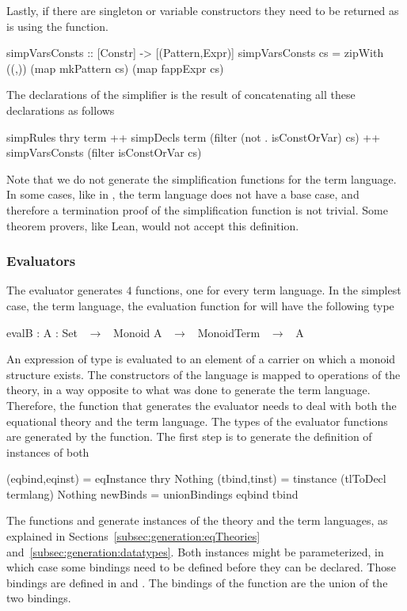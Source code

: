 Lastly, if there are singleton or variable constructors they need to be returned as is using the  function. 
\begin{hscode} 
simpVarsConsts :: [Constr] -> [(Pattern,Expr)]
simpVarsConsts cs =
  zipWith ((,)) (map mkPattern cs) (map fappExpr cs)
\end{hscode}  

The declarations of the simplifier is the result of concatenating all these declarations as follows 
\begin{hscode} 
 simpRules thry term
 ++ simpDecls term (filter (not . isConstOrVar) cs)
 ++ simpVarsConsts (filter isConstOrVar cs) 
\end{hscode} 

Note that we do not generate the simplification functions for the  term language. In some cases, like in , the  term language does not have a base case, and therefore a termination proof of the simplification function is not trivial. Some theorem provers, like Lean, would not accept this definition. 

\subsubsection{Evaluators}
\label{sec:generation:evaluator}
The evaluator generates $4$ functions, one for every term language. In the simplest case, the  term language, the evaluation function for  will have the following type 
\begin{agdacode}
 evalB : {A  : Set}  ~$\to$~ Monoid A  ~$\to$~ MonoidTerm  ~$\to$~ A
\end{agdacode}
An expression of type  is evaluated to an element of a carrier  on which a monoid structure exists. The constructors of the language is mapped to operations of the theory, in a way opposite to what was done to generate the term language. Therefore, the function that generates the evaluator needs to deal with both the equational theory and the term language. The types of the evaluator functions are generated by the  function. The first step is to generate the definition of instances of both 
\begin{hscode}
(eqbind,eqinst) = eqInstance thry Nothing
(tbind,tinst) = tinstance (tlToDecl termlang) Nothing
newBinds = unionBindings eqbind tbind
\end{hscode}
The functions  and  generate instances of the theory and the term languages, as explained in Sections~\ref{subsec:generation:eqTheories} and~\ref{subsec:generation:datatypes}. Both instances might be parameterized, in which case some bindings need to be defined before they can be declared. Those bindings are defined in  and . The bindings of the function are the union of the two bindings. 

